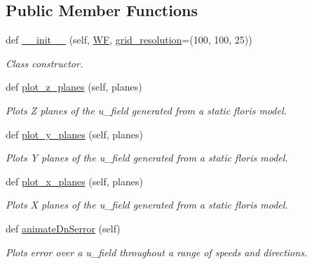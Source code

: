 \subsection*{Public Member Functions}
\begin{DoxyCompactItemize}
\item 
def \mbox{\hyperlink{classvisualization__manager___d_j_1_1_visualization_manager_ac262d79ceedca2ca4dd92b078a0851f1}{\+\_\+\+\_\+init\+\_\+\+\_\+}} (self, \mbox{\hyperlink{classvisualization__manager___d_j_1_1_visualization_manager_a56add1b450c7ecd758b096117f593578}{WF}}, \mbox{\hyperlink{classvisualization__manager___d_j_1_1_visualization_manager_ad5b8013f5cdf47f6384ae56186810e2b}{grid\+\_\+resolution}}=(100, 100, 25))
\begin{DoxyCompactList}\small\item\em Class constructor. \end{DoxyCompactList}\item 
def \mbox{\hyperlink{classvisualization__manager___d_j_1_1_visualization_manager_a05c519f1e0389278308ee046d27724cd}{plot\+\_\+z\+\_\+planes}} (self, planes)
\begin{DoxyCompactList}\small\item\em Plots Z planes of the u\+\_\+field generated from a static floris model. \end{DoxyCompactList}\item 
def \mbox{\hyperlink{classvisualization__manager___d_j_1_1_visualization_manager_ab0047d9eeda14999bdf8f8de191d9a33}{plot\+\_\+y\+\_\+planes}} (self, planes)
\begin{DoxyCompactList}\small\item\em Plots Y planes of the u\+\_\+field generated from a static floris model. \end{DoxyCompactList}\item 
def \mbox{\hyperlink{classvisualization__manager___d_j_1_1_visualization_manager_a4705f5926bdcecfd8d2d5aff434b2120}{plot\+\_\+x\+\_\+planes}} (self, planes)
\begin{DoxyCompactList}\small\item\em Plots X planes of the u\+\_\+field generated from a static floris model. \end{DoxyCompactList}\item 
def \mbox{\hyperlink{classvisualization__manager___d_j_1_1_visualization_manager_ab660449be49e49325d864dd1176e83f0}{animate\+Dn\+Serror}} (self)
\begin{DoxyCompactList}\small\item\em Plots error over a u\+\_\+field throughout a range of speeds and directions. \end{DoxyCompactList}\item 

\end{DoxyCompactItemize}
